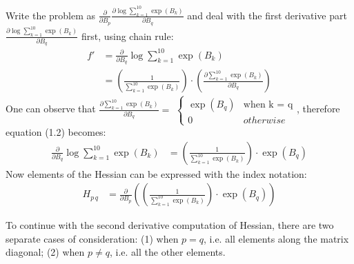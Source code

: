 \documentclass[12pt]{article}
\numberwithin{equation}{section}
\theoremstyle{remark}
\begin{document}
\medskip
Write the problem as $\frac{\partial}{\partial B_{p}}\frac{\partial\log \sum\limits_{k = 1}^{10} \exp \left( B_{k} \right)}{\partial B_{q}}$ and deal with the first derivative part $\frac{\partial\log \sum\limits_{k = 1}^{10} \exp \left( B_{k} \right)}{\partial B_{q}}$ first, using chain rule:
\begin{align}
            f' &= \frac{\partial}{\partial B_{q}}\log \sum\limits_{k = 1}^{10} \exp \left( B_{k} \right)\\
                        &= \left(\frac{1}{\sum\limits_{k = 1}^{10} \exp \left( B_{k} \right)}\right)\cdot\left(\frac{\partial\sum\limits_{k = 1}^{10} \exp \left( B_{k} \right)}{\partial B_{q}}\right)
\end{align}
One can observe that $\frac{\partial\sum\limits_{k = 1}^{10} \exp \left( B_{k} \right)}{\partial B_{q}} = $ \begin{math}
    \left\{
    \begin{array}{ll}
      \exp \left( B_{q} \right) & \mbox{when k = q} \\
      0 & otherwise
    \end{array}
    \right.
    \end{math}, therefore equation (1.2) becomes:
\begin{align}
            \frac{\partial}{\partial B_{q}}\log \sum\limits_{k = 1}^{10} \exp \left( B_{k} \right) &= \left(\frac{1}{\sum\limits_{k = 1}^{10} \exp \left( B_{k} \right)}\right)\cdot\exp \left( B_{q} \right)
\end{align}
Now elements of the Hessian can be expressed with the index notation:
\begin{align}
H_{p\,q} &= \frac{\partial}{\partial B_{p}}\left(\left(\frac{1}{\sum\limits_{k = 1}^{10} \exp \left( B_{k} \right)}\right)\cdot\exp \left( B_{q} \right)\right)
\end{align}

\medskip
To continue with the second derivative computation of Hessian, there are two separate cases of consideration: (1) when $p = q$, i.e. all elements along the matrix diagonal; (2) when $p \neq q$, i.e. all the other elements.
\end{document}
